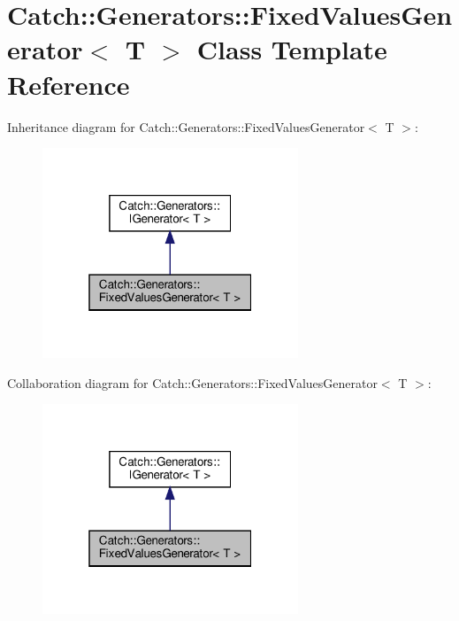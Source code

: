 \hypertarget{classCatch_1_1Generators_1_1FixedValuesGenerator}{}\section{Catch\+::Generators\+::Fixed\+Values\+Generator$<$ T $>$ Class Template Reference}
\label{classCatch_1_1Generators_1_1FixedValuesGenerator}


Inheritance diagram for Catch\+::Generators\+::Fixed\+Values\+Generator$<$ T $>$\+:
\nopagebreak
\begin{figure}[H]
\begin{center}
\leavevmode
\includegraphics[width=217pt]{classCatch_1_1Generators_1_1FixedValuesGenerator__inherit__graph}
\end{center}
\end{figure}


Collaboration diagram for Catch\+::Generators\+::Fixed\+Values\+Generator$<$ T $>$\+:
\nopagebreak
\begin{figure}[H]
\begin{center}
\leavevmode
\includegraphics[width=217pt]{classCatch_1_1Generators_1_1FixedValuesGenerator__coll__graph}
\end{center}
\end{figure}
